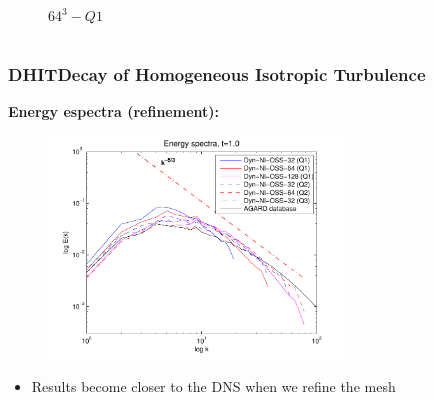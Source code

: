 \begin{frame}
\begin{columns}
\begin{column}{0.5\textwidth}
\begin{figure}
      \vspace*{-0.8cm}
  \caption{$64^3-Q1$}
  \end{figure}
  \end{column}
  \end{columns}
  \begin{overlayarea}{\textwidth}{1.5cm}
  \vspace*{-0.3cm}
  \end{overlayarea}
\end{frame}
\begin{frame}[t]
  \frametitle{DHIT{\small Decay of Homogeneous Isotropic Turbulence}}
  \textbf{Energy espectra (refinement):}
  \begin{figure}
    \centering	
    \includegraphics[width=0.7\textwidth]{Figures/spec_hp_1}
  \end{figure}
  \begin{overlayarea}{\textwidth}{1.5cm}
  \vspace*{-0.6cm}
  \begin{itemize}
  	\item Results become \alert<1->{closer to the DNS when we refine} the mesh
  \end{itemize}
  \end{overlayarea}
\end{frame}
